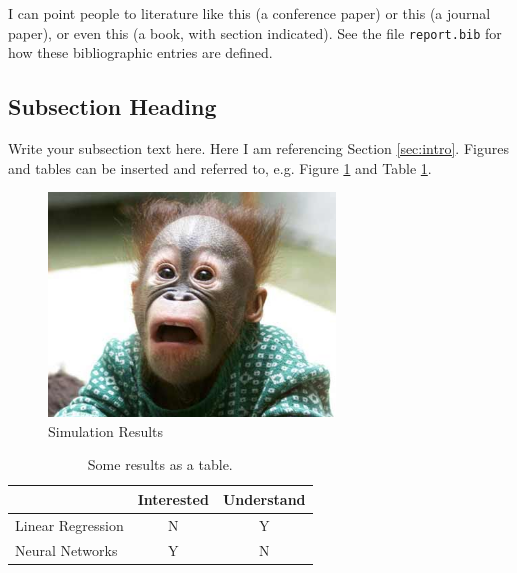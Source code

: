\documentclass[11point]{article}
\renewcommand{\vec}[1]{\boldsymbol{\mathbf{#1}}}
\begin{document}
I can point people to literature like this \cite{Mikolov2013} (a conference paper) or this \cite{Fawcett2006} (a journal paper), or even this \cite[Sec. 4.1]{Bishop2006} (a book, with section indicated). See the file \texttt{report.bib} for how these bibliographic entries are defined.


\subsection{Subsection Heading}
Write your subsection text here. Here I am referencing Section \ref{sec:intro}. Figures and tables can be inserted and referred to, e.g. Figure \ref{fig:simulation_figure} and Table \ref{tbl:results_table}.

\begin{figure}
    \centering
    \includegraphics[width=3.0in]{figures/myfigure.jpg}
    \caption{Simulation Results}
    \label{fig:simulation_figure}
\end{figure}

\begin{table}[htb]
  \centering
  \begin{tabular}{lcc}
  \toprule
  & Interested & Understand \\
  \midrule
  Linear Regression & N & Y \\
  Neural Networks & Y & N \\
  \bottomrule
  \end{tabular}
  \caption{Some results as a table.}
  \label{tbl:results_table}
\end{table}
\end{document}

